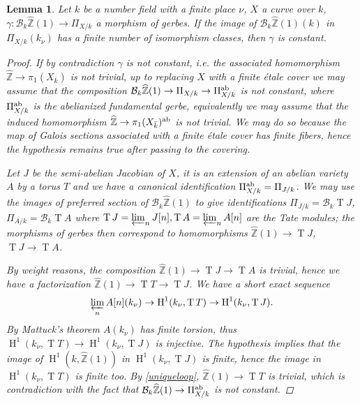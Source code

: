 \documentclass[11pt]{amsart}
\theoremstyle{plain}
\newtheorem{lemma}[theorem]{Lemma}
\theoremstyle{definition}
\newcommand{\on}{\operatorname}
\newcommand{\1}{\mathbb{1}}
\newcommand{\hz}{\hat{\mathbb{Z}}}
\renewcommand{\H}{\on{H}}
\renewcommand{\projlim}{\varprojlim}
\renewcommand{\hat}{\widehat}
\newcommand\cB{\mathcal{B}}
\begin{document}
\begin{lemma}\label{uniqueloop1}
	Let $k$ be a number field with a finite place $\nu$, $X$ a curve over $k$, $\gamma:\cB_{k}\hz(1)\to\Pi_{X/k}$ a morphism of gerbes. If the image of $\cB_{k}\hz(1)(k)$ in $\Pi_{X/k}(k_{\nu})$ has a finite number of isomorphism classes, then $\gamma$ is constant.
	\begin{proof}
		If by contradiction $\gamma$ is not constant, i.e. the associated homomorphism $\hz\to\pi_{1}(X_{\bar{k}})$ is not trivial, up to replacing $X$ with a finite étale cover we may assume that the composition $\cB_{k}\hz(1)\to\Pi_{X/k}\to\Pi_{X/k}^{\rm ab}$ is not constant, where $\Pi_{X/k}^{\rm ab}$ is the abelianized fundamental gerbe, equivalently we may assume that the induced homomorphism $\hz\to\pi_{1}(X_{\bar{k}})^{\rm ab}$ is not trivial. We may do so because the map of Galois sections associated with a finite étale cover has finite fibers, hence the hypothesis remains true after passing to the covering. 
		
		Let $J$ be the semi-abelian Jacobian of $X$, it is an extension of an abelian variety $A$ by a torus $T$ and we have a canonical identification $\Pi_{X/k}^{\rm ab}=\Pi_{J/k}$. We may use the images of preferred section of $\cB_{k}\hz(1)$ to give identifications $\Pi_{J/k}=\cB_{k}\on{T}J$, $\Pi_{A/k}=\cB_{k}\on{T}A$ where $\on{T}J=\projlim_{n}J[n],\on{T}A=\projlim_{n}A[n]$ are the Tate modules; the morphisms of gerbes then correspond to homomorphisms $\hz(1)\to\on{T}J$, $\on{T}J\to\on{T}A$.
		

		
		By weight reasons, the composition $\hz(1)\to\on{T}J\to\on{T}A$ is trivial, hence we have a factorization $\hz(1)\to\on{T}T\to\on{T}J$. We have a short exact sequence
		\[\projlim_{n}A[n](k_{\nu})\to\H^{1}(k_{\nu},\on{T}T)\to\H^{1}(k_{\nu},\on{T}J).\]
		By Mattuck's theorem \cite{mat55} $A(k_{\nu})$ has finite torsion, thus $\H^{1}(k_{\nu},\on{T}T)\to\H^{1}(k_{\nu},\on{T}J)$ is injective. The hypothesis implies that the image of $\H^{1}(k,\hz(1))$ in $\H^{1}(k_{\nu},\on{T}J)$ is finite, hence the image in $\H^{1}(k_{\nu},\on{T}T)$ is finite too. By \autoref{uniqueloop}, $\hz(1)\to\on{T}T$ is trivial, which is contradiction with the fact that $\cB_{k}\hz(1)\to\Pi_{X/k}^{\rm ab}$ is not constant.
		
	\end{proof}
\end{lemma}
 
\end{document}

